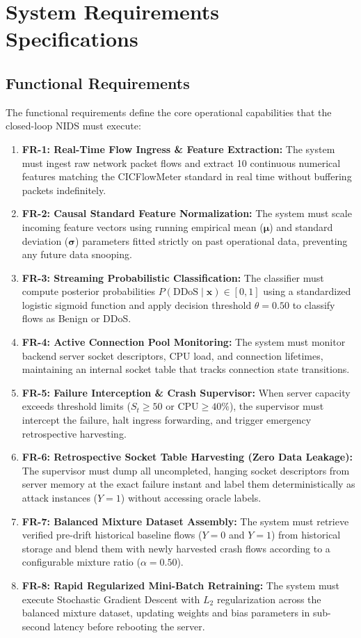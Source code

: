 \documentclass[12pt,a4paper,oneside]{report}
\begin{document}
\section{System Requirements Specifications}

\subsection{Functional Requirements}
The functional requirements define the core operational capabilities that the closed-loop NIDS must execute:
\begin{enumerate}
    \item \textbf{FR-1: Real-Time Flow Ingress \& Feature Extraction:} The system must ingest raw network packet flows and extract 10 continuous numerical features matching the CICFlowMeter standard \cite{lashkari2017} in real time without buffering packets indefinitely.
    \item \textbf{FR-2: Causal Standard Feature Normalization:} The system must scale incoming feature vectors using running empirical mean ($\boldsymbol{\mu}$) and standard deviation ($\boldsymbol{\sigma}$) parameters fitted strictly on past operational data, preventing any future data snooping.
    \item \textbf{FR-3: Streaming Probabilistic Classification:} The classifier must compute posterior probabilities $P(\text{DDoS} \mid \mathbf{x}) \in [0, 1]$ using a standardized logistic sigmoid function and apply decision threshold $\theta = 0.50$ to classify flows as Benign or DDoS.
    \item \textbf{FR-4: Active Connection Pool Monitoring:} The system must monitor backend server socket descriptors, CPU load, and connection lifetimes, maintaining an internal socket table that tracks connection state transitions.
    \item \textbf{FR-5: Failure Interception \& Crash Supervisor:} When server capacity exceeds threshold limits ($S_t \ge 50$ or $\text{CPU} \ge 40\%$), the supervisor must intercept the failure, halt ingress forwarding, and trigger emergency retrospective harvesting.
    \item \textbf{FR-6: Retrospective Socket Table Harvesting (Zero Data Leakage):} The supervisor must dump all uncompleted, hanging socket descriptors from server memory at the exact failure instant and label them deterministically as attack instances ($Y=1$) without accessing oracle labels.
    \item \textbf{FR-7: Balanced Mixture Dataset Assembly:} The system must retrieve verified pre-drift historical baseline flows ($Y=0$ and $Y=1$) from historical storage and blend them with newly harvested crash flows according to a configurable mixture ratio ($\alpha = 0.50$).
    \item \textbf{FR-8: Rapid Regularized Mini-Batch Retraining:} The system must execute Stochastic Gradient Descent with $L_2$ regularization across the balanced mixture dataset, updating weights and bias parameters in sub-second latency before rebooting the server.
\end{enumerate}
\end{document}
